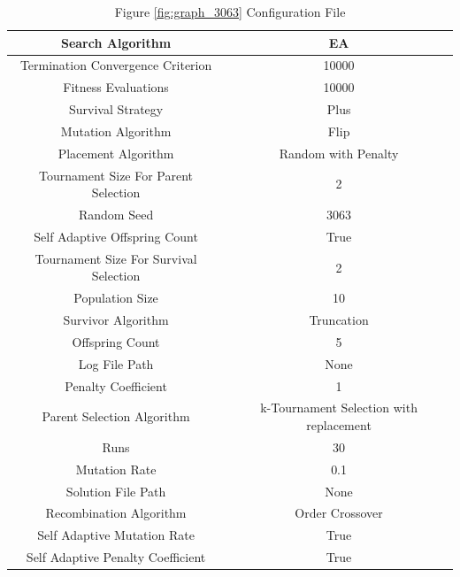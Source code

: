 \documentclass{standalone}
\begin{document}
\begin{table}[!htb]
	\centering
	\caption{Figure \ref{fig:graph_3063} Configuration File}
	\label{tab:graph_3063}
	\begin{tabular}{| c | c |}
		\hline
		Search Algorithm		& EA		 \\
		\hline
		Termination Convergence Criterion		& 10000		 \\
		\hline
		Fitness Evaluations		& 10000		 \\
		\hline
		Survival Strategy		& Plus		 \\
		\hline
		Mutation Algorithm		& Flip		 \\
		\hline
		Placement Algorithm		& Random with Penalty		 \\
		\hline
		Tournament Size For Parent Selection		& 2		 \\
		\hline
		Random Seed		& 3063		 \\
		\hline
		Self Adaptive Offspring Count		& True		 \\
		\hline
		Tournament Size For Survival Selection		& 2		 \\
		\hline
		Population Size		& 10		 \\
		\hline
		Survivor Algorithm		& Truncation		 \\
		\hline
		Offspring Count		& 5		 \\
		\hline
		Log File Path		& None		 \\
		\hline
		Penalty Coefficient		& 1		 \\
		\hline
		Parent Selection Algorithm		& k-Tournament Selection with replacement		 \\
		\hline
		Runs		& 30		 \\
		\hline
		Mutation Rate		& 0.1		 \\
		\hline
		Solution File Path		& None		 \\
		\hline
		Recombination Algorithm		& Order Crossover		 \\
		\hline
		Self Adaptive Mutation Rate		& True		 \\
		\hline
		Self Adaptive Penalty Coefficient		& True		 \\
		\hline
	\end{tabular}
\end{table}
\end{document}

